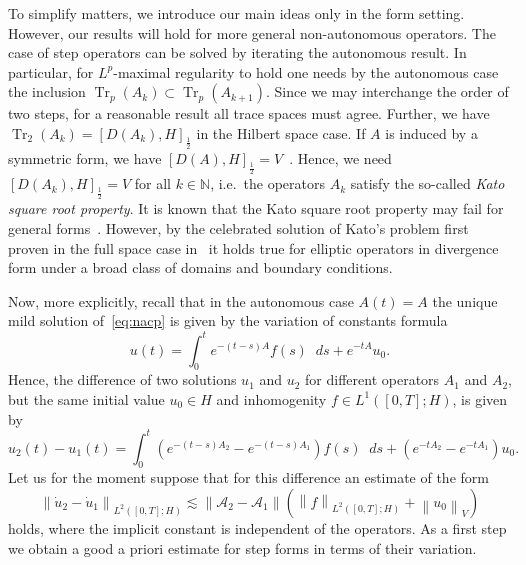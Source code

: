 \documentclass[reqno,a4paper,final]{amsart}
\numberwithin{equation}{section}
\theoremstyle{definition}
\begin{document}
	To simplify matters, we introduce our main ideas only in the form setting. However, our results will hold for more general non-autonomous operators. The case of step operators can be solved by iterating the autonomous result. In particular, for $L^p$-maximal regularity to hold one needs by the autonomous case the inclusion $\operatorname{Tr}_p(A_k) \subset \operatorname{Tr}_p(A_{k+1})$. Since we may interchange the order of two steps, for a reasonable result all trace spaces must agree. Further, we have $\operatorname{Tr}_2(A_k) = [D(A_k),H]_{\frac{1}{2}}$ in the Hilbert space case. If $A$ is induced by a symmetric form, we have $[D(A),H]_{\frac{1}{2}} = V$~\cite[Example~p.~45]{Are04}. Hence, we need $[D(A_k),H]_{\frac{1}{2}} = V$ for all $k \in {\mathbb{N}}$, i.e.\ the operators $A_k$ satisfy the so-called \emph{Kato square root property}. It is known that the Kato square root property may fail for general forms~\cite{McI72}. However, by the celebrated solution of Kato's problem first proven in the full space case in~\cite{AHL+02} it holds true for elliptic operators in divergence form under a broad class of domains and boundary conditions.
			
	Now, more explicitly, recall that in the autonomous case $A(t) = A$ the unique mild solution of~\eqref{eq:nacp} is given by the variation of constants formula
	\begin{equation*}
		u(t) = \int_0^t e^{-(t-s) A} f(s) {\mathop{}\!d} s + e^{-t A} u_0.
	\end{equation*}
	Hence, the difference of two solutions $u_1$ and $u_2$ for different operators $A_1$ and $A_2$, but the same initial value $u_0 \in H$ and inhomogenity $f \in L^1([0,T];H)$, is given by
	\begin{equation}
		\label{eq:difference}
		u_2(t) - u_1(t) = \int_0^t (e^{-(t-s) A_2} - e^{-(t-s) A_1}) f(s) {\mathop{}\!d} s + (e^{-t A_2} - e^{-t A_1}) u_0.
	\end{equation}
	Let us for the moment suppose that for this difference an estimate of the form 
		\begin{equation*}
			\tag{E}
			\label{eq:difference_estimate}
			{\left\lVert{\dot{u}_2 - \dot{u}_1}\right\rVert}_{L^2([0,T];H)} \lesssim {\left\lVert{\mathcal{A}_2 - \mathcal{A}_1}\right\rVert} ({\left\lVert{f}\right\rVert}_{L^2([0,T];H)} + {\left\lVert{u_0}\right\rVert}_V)
		\end{equation*} 
	holds, where the implicit constant is independent of the operators. As a first step we obtain a good a priori estimate for step forms in terms of their variation. 
	
\end{document}
